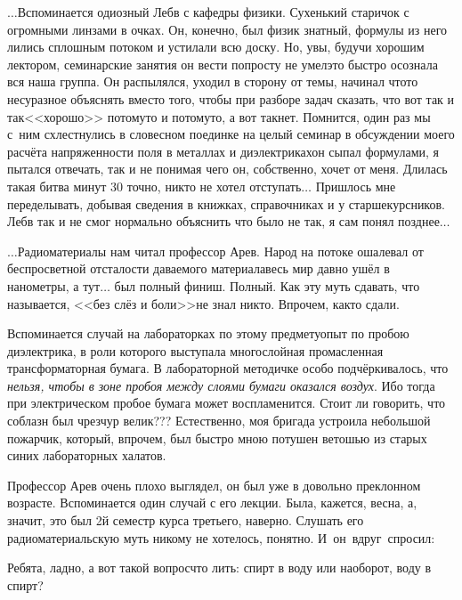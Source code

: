 $\ldots$Вспоминается одиозный Леб\sdash в с кафедры физики. Сухенький старичок с огромными линзами в очках. Он, конечно, был физик знатный, формулы из него лились сплошным потоком и устилали всю доску. Но, увы, будучи хорошим лектором, семинарские занятия он вести попросту не умел\mdash это быстро осознала вся наша группа. Он распылялся, уходил в сторону от темы, начинал что\sdash то несуразное объяснять вместо того, чтобы при разборе задач сказать, что вот так и так\mdash <<хорошо>> потому\sdash то и потому\sdash то, а вот так\mdash нет. Помнится, один раз мы с~ним схлестнулись в словесном поединке на целый семинар в обсуждении моего расчёта напряженности поля в металлах и диэлектриках\mdash он сыпал формулами, я пытался отвечать, так и не понимая чего он, собственно, хочет от меня. Длилась такая битва минут 30 точно, никто не хотел отступать$\ldots$ Пришлось мне переделывать, добывая сведения в книжках, справочниках и у старшекурсников. Леб\sdash в так и не смог нормально объяснить что было не так, я сам понял позднее$\ldots$

\vspace{1.0cm}

$\ldots$Радиоматериалы нам читал профессор Ар\sdash ев. Народ на потоке ошалевал от беспросветной отсталости даваемого материала\mdash весь мир давно ушёл в нанометры, а тут$\ldots$ был полный финиш. Полный. Как эту муть сдавать, что называется, <<без слёз и боли>>\mdash не знал никто. Впрочем, как\sdash то сдали. 

Вспоминается случай на лабораторках по этому предмету\mdash опыт по пробою диэлектрика, в роли которого выступала многослойная промасленная трансформаторная бумага. В лабораторной методичке особо подчёркивалось, что \textit{нельзя, чтобы в зоне пробоя между слоями бумаги оказался воздух}. Ибо тогда при электрическом пробое бумага может воспламенится. Стоит ли говорить, что соблазн был чрезчур велик??? Естественно, моя бригада устроила небольшой пожарчик, который, впрочем, был быстро мною потушен ветошью из старых синих лабораторных халатов.

Профессор Ар\sdash ев очень плохо выглядел, он был уже в довольно преклонном возрасте. Вспоминается один случай с его лекции. Была, кажется, весна, а, значит, это был 2\sdash й семестр курса третьего, наверно. Слушать его радиоматериальскую муть никому не хотелось, понятно. И~он~вдруг~спросил:

\diagdash Ребята, ладно, а вот такой вопрос\mdash что лить: спирт в воду или наоборот, воду в спирт?


